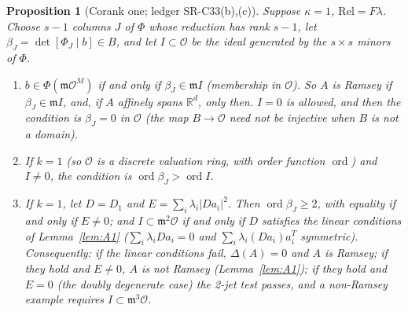 \documentclass[11pt]{amsart}
\newcommand{\R}{\mathbb{R}}
\theoremstyle{plain}
\newtheorem{proposition}[theorem]{Proposition}
\theoremstyle{definition}
\begin{document}
\begin{proposition}[Corank one; ledger SR-C33(b),(c)]\label{prop:corankone}
Suppose $\kappa=1$, $\mathrm{Rel}=F\lambda$. Choose $s-1$ columns $J$ of $\Phi$ whose reduction has rank
$s-1$, let $\beta_J=\det[\Phi_J\mid b]\in B$, and let $I\subset\mathcal O$ be the ideal generated by the
$s\times s$ minors of $\Phi$.
\begin{enumerate}
\item[(a)] $b\in\Phi(\mathfrak m\mathcal O^M)$ if and only if $\beta_J\in\mathfrak mI$ (membership in
$\mathcal O$). So $A$ is Ramsey if $\beta_J\in\mathfrak mI$, and, if $A$ affinely spans $\R^d$, only then.
$I=0$ is allowed, and then the condition is $\beta_J=0$ in $\mathcal O$ (the map $B\to\mathcal O$ need not
be injective when $B$ is not a domain).
\item[(b)] If $k=1$ (so $\mathcal O$ is a discrete valuation ring, with order function
$\operatorname{ord}$) and $I\ne0$, the condition is $\operatorname{ord}\beta_J>\operatorname{ord}I$.
\item[(c)] If $k=1$, let $D=D_1$ and $E=\sum_i\lambda_i|Da_i|^2$. Then $\operatorname{ord}\beta_J\ge2$, with
equality if and only if $E\ne0$; and $I\subset\mathfrak m^2\mathcal O$ if and only if $D$ satisfies the linear
conditions of Lemma~\ref{lem:A1} ($\sum_i\lambda_iDa_i=0$ and $\sum_i\lambda_i(Da_i)a_i^T$ symmetric).
Consequently: if the linear conditions fail, $\Delta(A)=0$ and $A$ is Ramsey; if they hold and $E\ne0$, $A$
is not Ramsey (Lemma~\ref{lem:A1}); if they hold and $E=0$ (the \emph{doubly degenerate} case) the 2-jet test
passes, and a non-Ramsey example requires $I\subset\mathfrak m^3\mathcal O$.
\end{enumerate}
\end{proposition}
\end{document}

